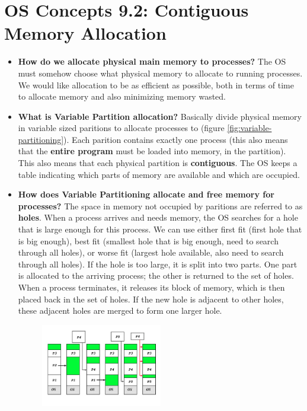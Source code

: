 \documentclass[12pt]{article}
\begin{document}
\section*{OS Concepts 9.2: Contiguous Memory Allocation}

\begin{itemize}
    \item \textbf{How do we allocate physical main memory to processes?} The OS must somehow choose what physical memory to allocate to running processes. We would like allocation to be as efficient as possible, both in terms of time to allocate memory and also minimizing memory wasted.
    \item \textbf{What is Variable Partition allocation?} Basically divide physical memory in variable sized paritions to allocate processes to (figure \ref{fig:variable-partitioning}). Each parition contains exactly one process (this also means that the \textbf{entire program} must be loaded into memory, in the partition). This also means that each physical partition is \textbf{contiguous}. The OS keeps a table indicating which parts of memory are available and which are occupied.
    \item \textbf{How does Variable Partitioning allocate and free memory for processes?} The space in memory not occupied by paritions are referred to as \textbf{holes}. When a process arrives and needs memory, the OS searches for a hole that is large enough for this process. We can use either first fit (first hole that is big enough), best fit (smallest hole that is big enough, need to search through all holes), or worse fit (largest hole available, also need to search through all holes). If the hole is too large, it is split into two parts. One part is allocated to the arriving process; the other is returned to the set of holes. When a process terminates, it releases its block of memory, which is then placed back in the set of holes. If the new hole is adjacent to other holes, these adjacent holes are merged to form one larger hole.
        \begin{figure}[ht]
            \centering
            \includegraphics[width=0.5\textwidth]{figures/variable-partitioning.jpg}

\end{figure}
\end{itemize}
\end{document}

